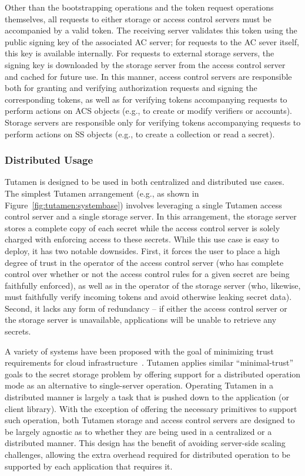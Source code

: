 Other than the bootstrapping operations and the token request
operations themselves, all requests to either storage or access
control servers must be accompanied by a valid token. The receiving
server validates this token using the public signing key of the
associated AC server; for requests to the AC sever itself, this key is
available internally. For requests to external storage servers, the
signing key is downloaded by the storage server from the access
control server and cached for future use. In this manner, access
control servers are responsible both for granting and verifying
authorization requests and signing the corresponding tokens, as well
as for verifying tokens accompanying requests to perform actions on
ACS objects (e.g., to create or modify verifiers or accounts). Storage
servers are responsible only for verifying tokens accompanying
requests to perform actions on SS objects (e.g., to create a collection
or read a secret).

\subsubsection{Distributed Usage}
\label{chap:tutamen:platform:arch:distributed}

Tutamen is designed to be used in both centralized and distributed use
cases. The simplest Tutamen arrangement (e.g., as shown in
Figure~\ref{fig:tutamen:systembase}) involves leveraging a single
Tutamen access control server and a single storage server. In this
arrangement, the storage server stores a complete copy of each secret
while the access control server is solely charged with enforcing
access to these secrets. While this use case is easy to deploy, it has
two notable downsides. First, it forces the user to place a high
degree of trust in the operator of the access control server (who has
complete control over whether or not the access control rules for a
given secret are being faithfully enforced), as well as in the
operator of the storage server (who, likewise, must faithfully verify
incoming tokens and avoid otherwise leaking secret data). Second, it
lacks any form of redundancy -- if either the access control server or
the storage server is unavailable, applications will be unable to
retrieve any secrets.

A variety of systems have been proposed with the goal of minimizing
trust requirements for cloud infrastructure~\cite{bessani2011,
  kallahalla2003, kubiatowicz2000, mahajan2011,
  wilcox-o'hearn2008}. Tutamen applies similar ``minimal-trust'' goals
to the secret storage problem by offering support for a distributed
operation mode as an alternative to single-server operation. Operating
Tutamen in a distributed manner is largely a task that is pushed down
to the application (or client library). With the exception of offering
the necessary primitives to support such operation, both Tutamen
storage and access control servers are designed to be largely agnostic
as to whether they are being used in a centralized or a distributed
manner. This design has the benefit of avoiding server-side scaling
challenges, allowing the extra overhead required for distributed
operation to be supported by each application that requires it.


